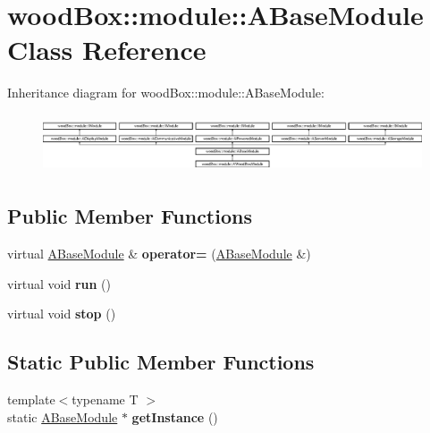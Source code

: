 \hypertarget{classwood_box_1_1module_1_1_a_base_module}{}\section{wood\+Box\+:\+:module\+:\+:A\+Base\+Module Class Reference}
\label{classwood_box_1_1module_1_1_a_base_module}
Inheritance diagram for wood\+Box\+:\+:module\+:\+:A\+Base\+Module\+:\begin{figure}[H]
\begin{center}
\leavevmode
\includegraphics[height=1.729730cm]{classwood_box_1_1module_1_1_a_base_module}
\end{center}
\end{figure}
\subsection*{Public Member Functions}
\begin{DoxyCompactItemize}
\item 
\mbox{\label{classwood_box_1_1module_1_1_a_base_module_a8997e5765ffb9ad996d57d0dddea93e4}} 
virtual \mbox{\hyperlink{classwood_box_1_1module_1_1_a_base_module}{A\+Base\+Module}} \& {\bfseries operator=} (\mbox{\hyperlink{classwood_box_1_1module_1_1_a_base_module}{A\+Base\+Module}} \&)
\item 
\mbox{\label{classwood_box_1_1module_1_1_a_base_module_a3be59fd4669740f9b7db7af31d676dfc}} 
virtual void {\bfseries run} ()
\item 
\mbox{\label{classwood_box_1_1module_1_1_a_base_module_ab11ff2fcd98e85183dfbd450e74258fe}} 
virtual void {\bfseries stop} ()
\end{DoxyCompactItemize}
\subsection*{Static Public Member Functions}
\begin{DoxyCompactItemize}
\item 
\mbox{\label{classwood_box_1_1module_1_1_a_base_module_a08ba1924981ed852924f7047f915986b}} 
{\footnotesize template$<$typename T $>$ }\\static \mbox{\hyperlink{classwood_box_1_1module_1_1_a_base_module}{A\+Base\+Module}} $\ast$ {\bfseries get\+Instance} ()
\end{DoxyCompactItemize}
